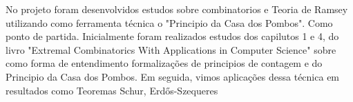 No projeto foram desenvolvidos estudos sobre combinatorios e Teoria de Ramsey utilizando como ferramenta técnica o "Principio da Casa dos Pombos". Como ponto de partida. Inicialmente foram realizados estudos dos capilutos 1 e 4, do livro  "Extremal Combinatorics With Applications in Computer Science" \cite{jukna} sobre como forma de entendimento formalizações de principios de contagem e do Principio da Casa dos Pombos. Em seguida, vimos aplicações dessa técnica em resultados como Teoremas Schur, Erd\H{o}s-Szequeres 